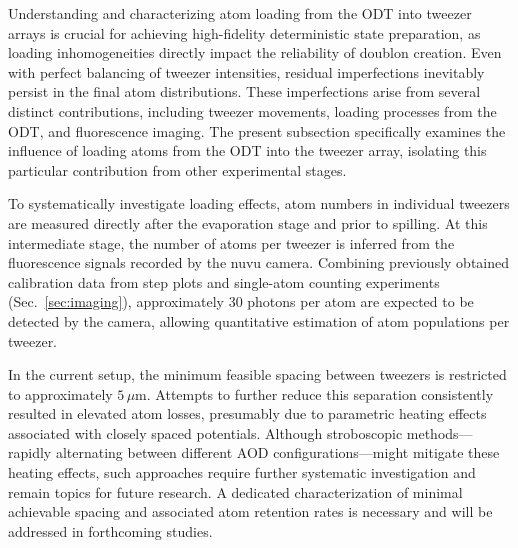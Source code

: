 Understanding and characterizing atom loading from the ODT into tweezer arrays is crucial for achieving high-fidelity deterministic state preparation, as loading inhomogeneities directly impact the reliability of doublon creation. Even with perfect balancing of tweezer intensities, residual imperfections inevitably persist in the final atom distributions. These imperfections arise from several distinct contributions, including tweezer movements, loading processes from the ODT, and fluorescence imaging. The present subsection specifically examines the influence of loading atoms from the ODT into the tweezer array, isolating this particular contribution from other experimental stages.


To systematically investigate loading effects, atom numbers in individual tweezers are measured directly after the evaporation stage and prior to spilling. At this intermediate stage, the number of atoms per tweezer is inferred from the fluorescence signals recorded by the nuvu camera. Combining previously obtained calibration data from step plots and single-atom counting experiments (Sec.~\ref{sec:imaging}), approximately 30 photons per atom are expected to be detected by the camera, allowing quantitative estimation of atom populations per tweezer.

In the current setup, the minimum feasible spacing between tweezers is restricted to approximately $5\,\mu$m. Attempts to further reduce this separation consistently resulted in elevated atom losses, presumably due to parametric heating effects associated with closely spaced potentials. Although stroboscopic methods—rapidly alternating between different AOD configurations—might mitigate these heating effects, such approaches require further systematic investigation and remain topics for future research. A dedicated characterization of minimal achievable spacing and associated atom retention rates is necessary and will be addressed in forthcoming studies.

